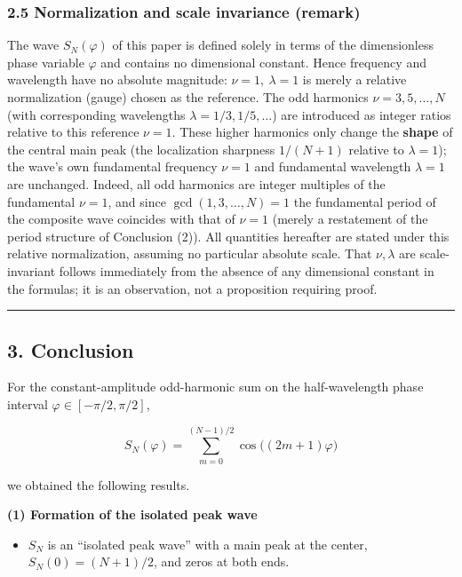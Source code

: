 \documentclass[
]{ltjsarticle}
\providecommand{\tightlist}{%
  \setlength{\itemsep}{0pt}\setlength{\parskip}{0pt}}
\begin{document}
\subsubsection{2.5 Normalization and scale invariance
(remark)}\label{normalization-and-scale-invariance-remark}

The wave \(S_N(\varphi)\) of this paper is defined solely in terms of
the dimensionless phase variable \(\varphi\) and contains no dimensional
constant. Hence frequency and wavelength have no absolute magnitude:
\(\nu=1,\ \lambda=1\) is merely a relative normalization (gauge) chosen
as the reference. The odd harmonics \(\nu=3,5,\dots,N\) (with
corresponding wavelengths \(\lambda=1/3,1/5,\dots\)) are introduced as
integer ratios relative to this reference \(\nu=1\). These higher
harmonics only change the \textbf{shape} of the central main peak (the
localization sharpness \(1/(N+1)\) relative to \(\lambda=1\)); the
wave's own fundamental frequency \(\nu=1\) and fundamental wavelength
\(\lambda=1\) are unchanged. Indeed, all odd harmonics are integer
multiples of the fundamental \(\nu=1\), and since
\(\gcd(1,3,\dots,N)=1\) the fundamental period of the composite wave
coincides with that of \(\nu=1\) (merely a restatement of the period
structure of Conclusion (2)). All quantities hereafter are stated under
this relative normalization, assuming no particular absolute scale. That
\(\nu,\lambda\) are scale-invariant follows immediately from the absence
of any dimensional constant in the formulas; it is an observation, not a
proposition requiring proof.

\begin{center}\rule{0.5\linewidth}{0.5pt}\end{center}

\subsection{3. Conclusion}\label{conclusion}

For the constant-amplitude odd-harmonic sum on the half-wavelength phase
interval \(\varphi\in[-\pi/2,\pi/2]\),

\[
S_N(\varphi)=\sum_{m=0}^{(N-1)/2}\cos\!\big((2m+1)\varphi\big)
\]

we obtained the following results.

\textbf{(1) Formation of the isolated peak wave}

\begin{itemize}
\tightlist
\item
  \(S_N\) is an ``isolated peak wave'' with a main peak at the center,
  \(S_N(0)=(N+1)/2\), and zeros at both ends.
\end{itemize}
\end{document}
